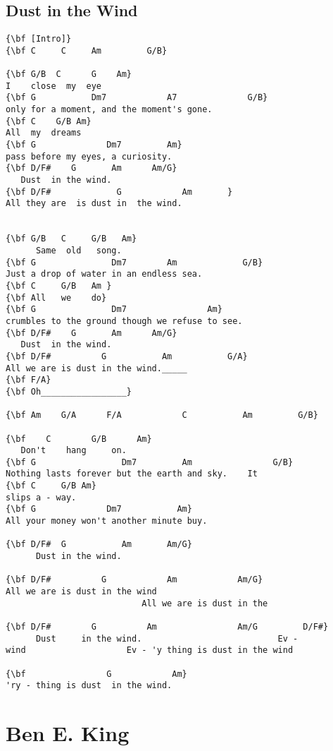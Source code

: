 \documentclass[a4paper]{article}
\begin{document}
\subsection{Dust in the Wind} %
\label{sub:Dust in the Wi}
\begin{Verbatim}[commandchars=\\\{\}]
{\bf [Intro]}
{\bf C     C     Am         G/B}

{\bf G/B  C      G    Am}
I    close  my  eye
{\bf G           Dm7            A7              G/B}
only for a moment, and the moment's gone.
{\bf C    G/B Am}
All  my  dreams
{\bf G              Dm7         Am}
pass before my eyes, a curiosity.
{\bf D/F#    G       Am      Am/G}
   Dust  in the wind.
{\bf D/F#             G            Am       }
All they are  is dust in  the wind.


{\bf G/B   C     G/B   Am}
      Same  old   song.
{\bf G               Dm7        Am             G/B}
Just a drop of water in an endless sea.   
{\bf C     G/B   Am }
{\bf All   we    do}
{\bf G               Dm7                Am}
crumbles to the ground though we refuse to see.
{\bf D/F#    G       Am      Am/G}
   Dust  in the wind.                
{\bf D/F#          G           Am           G/A}
All we are is dust in the wind._____      
{\bf F/A}
{\bf Oh_________________}

{\bf Am    G/A      F/A            C           Am         G/B}

{\bf    C        G/B      Am}
   Don't    hang     on.
{\bf G                 Dm7         Am                G/B}
Nothing lasts forever but the earth and sky.    It
{\bf C     G/B Am}
slips a - way.
{\bf G              Dm7           Am}
All your money won't another minute buy.

{\bf D/F#  G           Am       Am/G}
      Dust in the wind.        

{\bf D/F#          G            Am            Am/G}
All we are is dust in the wind
                           All we are is dust in the 

{\bf D/F#        G          Am                Am/G         D/F#}
      Dust     in the wind.                           Ev -
wind                    Ev - 'y thing is dust in the wind 

{\bf                G            Am}
'ry - thing is dust  in the wind.
\end{Verbatim}
\newpage
\section{Ben E. King} %
\label{sec:Ben E. King}
\end{document}
